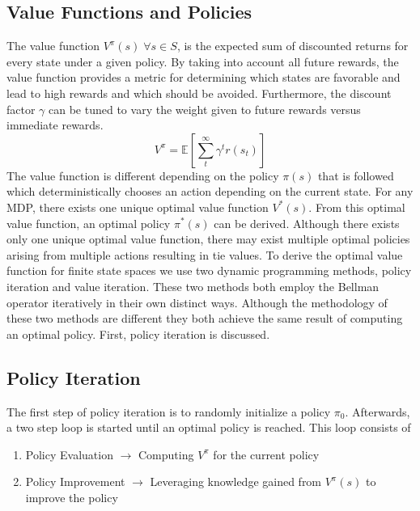 \documentclass[fullpage]{article}
\begin{document}
\subsection{Value Functions and Policies}
The value function $V^\pi(s) \; \forall s \in S$, is the expected sum of discounted returns for every state under a given policy. By taking into account all future rewards, the value function provides a metric for determining which states are favorable and lead to high rewards and which should be avoided. Furthermore, the discount factor $\gamma$ can be tuned to vary the weight given to future rewards versus immediate rewards.
\[
V^\pi = \mathbb{E}[\sum_t^\infty \gamma^t r(s_t)]
\]
The value function is different depending on the policy $\pi(s)$ that is followed which deterministically chooses an action depending on the current state. For any MDP, there exists one unique optimal value function $V^*(s)$. From this optimal value function, an optimal policy $\pi^*(s)$ can be derived. Although there exists only one unique optimal value function, there may exist multiple optimal policies arising from multiple actions resulting in tie values.
To derive the optimal value function for finite state spaces we use two dynamic programming methods, policy iteration and value iteration. These two methods both employ the Bellman operator iteratively in their own distinct ways. Although the methodology of these two methods are different they both achieve the same result of computing an optimal policy. First, policy iteration is discussed.

\subsection{Policy Iteration}
The first step of policy iteration is to randomly initialize a policy $\pi_0$. Afterwards, a two step loop is started until an optimal policy is reached. This loop consists of

\begin{enumerate}
\item Policy Evaluation $\rightarrow$ Computing $V^\pi$ for the current policy
\item Policy Improvement $\rightarrow$ Leveraging knowledge gained from $V^\pi(s)$ to improve the policy
\end{enumerate}
\end{document}
